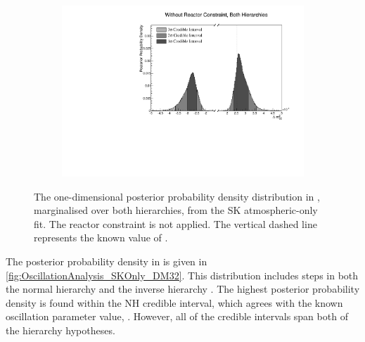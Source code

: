 \begin{figure}[h]
  \begin{subfigure}[t]{0.98\textwidth}
    \includegraphics[width=\textwidth, trim={0mm 0mm 0mm 0mm}, clip,page=1]{Figures/OA/SKOnlyFit/Contours_1D_dm32_BH_1_woRC_UnSmeared_CredibleInterval.pdf}
  \end{subfigure}
  \caption{The one-dimensional posterior probability density distribution in , marginalised over both hierarchies, from the SK atmospheric-only fit. The reactor constraint is not applied. The vertical dashed line represents the known value of .}
  \label{fig:OscillationAnalysis_SKOnly_DM32}
\end{figure}

The posterior probability density in  is given in \autoref{fig:OscillationAnalysis_SKOnly_DM32}. This distribution includes steps in both the normal hierarchy  and the inverse hierarchy . The highest posterior probability density is found within the NH \quickmath{1\sigma} credible interval, which agrees with the known oscillation parameter value, . However, all of the credible intervals span both of the hierarchy hypotheses.

